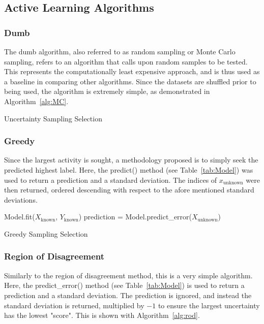     \subsection{Active Learning Algorithms}

    \subsubsection{Dumb}

    The dumb algorithm, also referred to as random sampling or Monte Carlo sampling, refers to an algorithm that calls upon random samples to be tested. This represents the computationally least expensive approach, and is thus used as a baseline in comparing other algorithms. Since the datasets are shuffled prior to being used, the algorithm is extremely simple, as demonstrated in Algorithm~\ref{alg:MC}.

    \begin{algorithm}[h]
        \caption{Uncertainty Sampling Selection}
        \label{alg:MC}\SetAlgoLined
    \end{algorithm}

    \subsubsection{Greedy}
    Since the largest activity is sought, a methodology proposed is to simply seek the predicted highest label. Here, the predict() method (see Table~\ref{tab:Model}) was used to return a prediction and a standard deviation. The indices of $x_\mathrm{unknown}$ were then returned, ordered descending with respect to the afore mentioned standard deviations.

    \begin{algorithm}[h]
        Model.fit($X_\mathrm{known}$, $Y_\mathrm{known}$)\;
        prediction = Model.predict\_error($X_\mathrm{unknown}$)\;
        \caption{Greedy Sampling Selection}
        \label{alg:greedy}\SetAlgoLined
    \end{algorithm}

    \subsubsection{Region of Disagreement}
    Similarly to the region of disagreement method, this is a very simple algorithm. Here, the predict\_error() method (see Table~\ref{tab:Model}) is used to return a prediction and a standard deviation. The prediction is ignored, and instead the standard deviation is returned, multiplied by $-1$ to ensure the largest uncertainty has the lowest "score". This is shown with Algorithm~\ref{alg:rod}.

